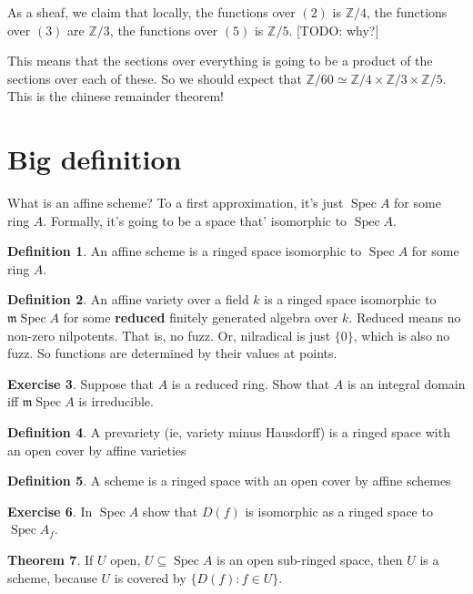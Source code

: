 \documentclass{book}
\newcommand{\Z}{\ensuremath{\mathbb{Z}}}
\newcommand{\Spec}{\operatorname{Spec}}
\newcommand{\spec}{\operatorname{Spec}}
\newcommand{\m}{\mathfrak{m}}
\newcommand{\mSpec}{\m\operatorname{Spec}}
\theoremstyle{definition}
\newtheorem{theorem}{Theorem}
\newtheorem{definition}[theorem]{Definition}
\newtheorem{exercise}[theorem]{Exercise}
\begin{document}
As a sheaf, we claim that locally, the functions over $(2)$ is $\Z/4$,
the functions over $(3)$ are $\Z/3$, the functions over $(5)$ is $\Z/5$.
[TODO: why?]


This means that the sections over everything is going to be a product of
the sections over each of these. So we should expect that
$\Z/60 \simeq \Z/4 \times\Z/3 \times \Z/5$. This is the chinese remainder
theorem!


\section{Big definition}
What is an affine scheme? To a first approximation, it's just $\Spec A$ for
some ring $A$. Formally, it's going to be a space that' isomorphic to
$\Spec A$.


\begin{definition}
An affine scheme is a ringed space isomorphic to $\Spec A$ for some ring $A$.
\end{definition}

\begin{definition}
An affine variety over a field $k$ is a ringed space isomorphic to 
$\mSpec A$ for some \textbf{reduced} finitely generated algebra over $k$.
Reduced means no non-zero nilpotents. That is, no fuzz. Or, nilradical
is just $\{ 0 \}$, which is also no fuzz. So functions are determined
by their values at points.
\end{definition}

\begin{exercise}
Suppose that $A$ is a reduced ring. Show that $A$ is an integral domain
iff $\mSpec A$ is irreducible. 
\end{exercise}

\begin{definition}
A prevariety (ie, variety minus Hausdorff) is a ringed space with an
open cover by affine varieties
\end{definition}


\begin{definition}
A scheme is a ringed space with an open cover by affine schemes
\end{definition}

\begin{exercise}
In $\spec A$ show that $D(f)$ is isomorphic as a ringed space to  $\spec A_f$.
\end{exercise}


\begin{theorem}
If $U$ open, $U \subseteq \spec A$ is an open sub-ringed space, then $U$
is a scheme, because $U$ is covered by $\{ D(f) : f \in U\}$.
\end{theorem}
\end{document}
